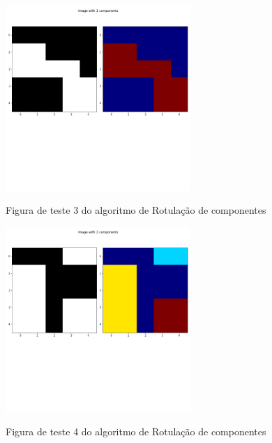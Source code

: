 \documentclass{article}
\begin{document}
\begin{figure}[!ht]
	\begin{minipage}[b]{1.0\linewidth}
		\centering
		\centerline{\includegraphics[width=7cm]{Figures/test3.png}}
		\label{fig: test3}
		\vspace{-2.0cm}
		\centerline{Figura de teste 3 do algoritmo de Rotulação de componentes}\medskip	
	\end{minipage}
\end{figure}

\begin{figure}[!ht]
	\begin{minipage}[b]{1.0\linewidth}
		\centering
		\centerline{\includegraphics[width=7cm]{Figures/test4.png}}
		\label{fig: test4}	
		\vspace{-2.0cm}
		\centerline{Figura de teste 4 do algoritmo de Rotulação de componentes}\medskip
	\end{minipage}
\end{figure}
\end{document}
